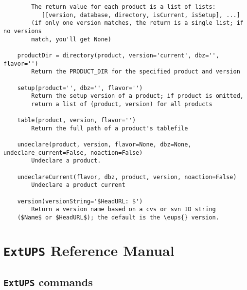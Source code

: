 \documentclass{article}
\newcommand{\code}[1]{\texttt{#1}}
\newcommand{\eups}{\code{ExtUPS}}
\begin{document}
\begin{verbatim}
        The return value for each product is a list of lists:
           [[version, database, directory, isCurrent, isSetup], ...]
        (if only one version matches, the return is a single list; if no versions
        match, you'll get None)
    
    productDir = directory(product, version='current', dbz='', flavor='')
        Return the PRODUCT_DIR for the specified product and version
    
    setup(product='', dbz='', flavor='')
        Return the setup version of a product; if product is omitted,
        return a list of (product, version) for all products
    
    table(product, version, flavor='')
        Return the full path of a product's tablefile
    
    undeclare(product, version, flavor=None, dbz=None, undeclare_current=False, noaction=False)
        Undeclare a product.
    
    undeclareCurrent(flavor, dbz, product, version, noaction=False)
        Undeclare a product current
    
    version(versionString='$HeadURL: $')
        Return a version name based on a cvs or svn ID string
	($Name$ or $HeadURL$); the default is the \eups{} version.
\end{verbatim}

\appendix

\section{\eups{} Reference Manual}

\subsection{\eups{} commands}
\end{document}
